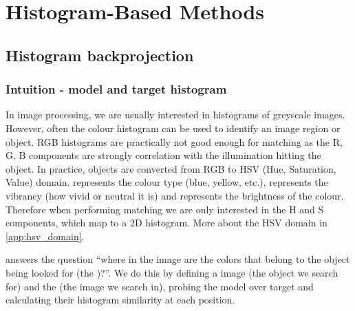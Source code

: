 \documentclass[a4paper]{article}
\begin{document}






\newpage
\tableofcontents
\newpage

\section{Histogram-Based Methods}

\subsection{Histogram backprojection}

\subsubsection{Intuition - model and target histogram}
In image processing, we are usually interested in histograms of greyscale images. However, often the colour histogram can be used to identify an image region or object. RGB histograms are practically not good enough for matching as the R, G, B components are strongly correlation with the illumination hitting the object. In practice, objects are converted from RGB to HSV (Hue, Saturation, Value) domain.  represents the colour type (blue, yellow, etc.),  represents the vibrancy (how vivid or neutral it is) and  represents the brightness of the colour. Therefore when performing matching we are only interested in the H and S components, which map to a 2D histogram. More about the HSV domain in \ref{app:hsv_domain}.

 answers the question ``where in the image are the colors that belong to the object being looked for (the )?''. We do this by defining a  image (the object we search for) and the  (the image we search in), probing the model over target and calculating their histogram  similarity at each position.
\end{document}
